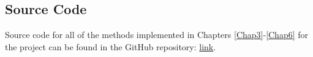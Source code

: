 \documentclass[12pt, a4paper]{report}
\begin{document}








\renewcommand{\bibname}{References}

%

\begin{appendices}


\chapter{Source Code} \label{System Requirements}
Source code for all of the methods implemented in Chapters \ref{Chap3}-\ref{Chap6} for the project can be found in the GitHub repository: \newline \url{link}.

\end{appendices}
\clearpage
\printglossaries

\end{document}
